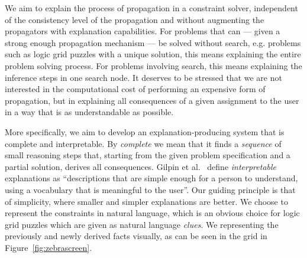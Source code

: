 We aim to explain the process of propagation in a constraint solver, independent of the consistency level of the propagation and without augmenting the propagators with explanation capabilities.
For problems that can --- given a strong enough propagation mechanism --- be solved without search, e.g. problems such as logic grid puzzles with a unique solution, this means explaining the entire problem solving process. For problems involving search, this means explaining the inference steps  in one search node. 
It deserves to be stressed that we are not interested in the computational cost of performing an expensive form of propagation, but in explaining all consequences of a given assignment to the user in a way that is as understandable as possible. 

More specifically, we aim to develop an explanation-producing system that is complete and interpretable. By \textit{complete} we mean that it finds a \textit{sequence} of small reasoning steps that, starting from the given problem specification and a partial solution, derives all consequences. 
%
Gilpin et al.~\cite{DBLP:conf/dsaa/GilpinBYBSK18} define \textit{interpretable} explanations as ``descriptions that are simple enough for a person to understand, using a vocabulary that is meaningful to the user''. Our guiding principle is that of simplicity, where smaller and simpler explanations are better. %
We choose to represent the constraints in natural language, which is an obvious choice for logic grid puzzles which are given as natural language \textit{clues}. We representing the previously and newly derived facts visually, as can be seen in the grid in Figure~\ref{fig:zebrascreen}.

